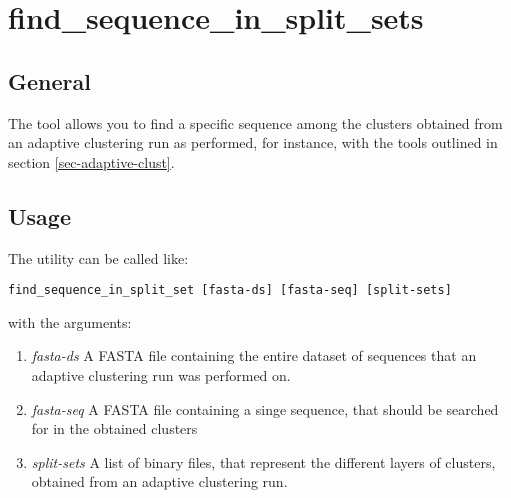 \section{find\_sequence\_in\_split\_sets}

\subsection{General}

The tool allows you to find a specific sequence among the clusters
obtained from an adaptive clustering run as performed, for instance, with the
tools outlined in section \ref{sec-adaptive-clust}.

\subsection{Usage}

The utility can be called like:
\begin{lstlisting}
find_sequence_in_split_set [fasta-ds] [fasta-seq] [split-sets]
\end{lstlisting}
with the arguments:
\begin{enumerate}
  \item \emph{fasta-ds} A FASTA file containing the entire dataset of
    sequences that an adaptive clustering run was performed on.
  \item \emph{fasta-seq} A FASTA file containing a singe sequence,
    that should be searched for in the obtained clusters
  \item \emph{split-sets} A list of binary files, that represent the
    different layers of clusters, obtained from an adaptive clustering
    run.
\end{enumerate}

